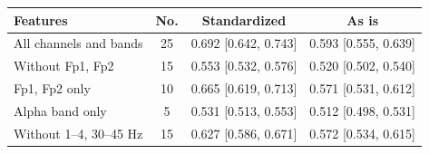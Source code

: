 \begin{tabular}{@{}lccc@{}}
\toprule
Features & No. & Standardized & As is \\
\midrule
All channels and bands & 25 & 0.692 [0.642, 0.743] & 0.593 [0.555, 0.639] \\
Without Fp1, Fp2 & 15 & 0.553 [0.532, 0.576] & 0.520 [0.502, 0.540] \\
Fp1, Fp2 only & 10 & 0.665 [0.619, 0.713] & 0.571 [0.531, 0.612] \\
Alpha band only & 5 & 0.531 [0.513, 0.553] & 0.512 [0.498, 0.531] \\
Without 1--4, 30--45 Hz & 15 & 0.627 [0.586, 0.671] & 0.572 [0.534, 0.615] \\
\bottomrule
\end{tabular}
